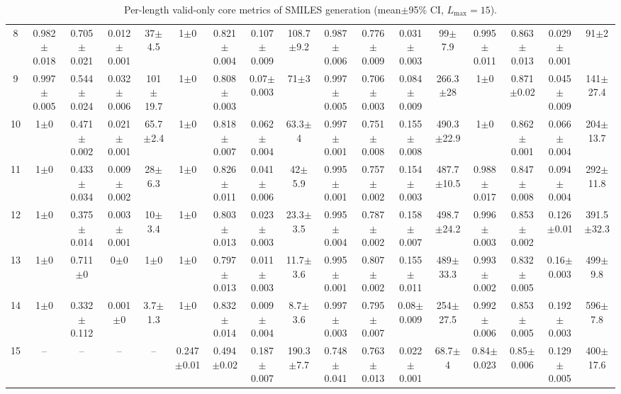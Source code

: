 \documentclass{article}
\theoremstyle{plain}
\theoremstyle{definition}
\theoremstyle{remark}
\begin{document}
\begin{table}[!htbp]
{\begin{tabular}{ccccccccccccccccc}
8 & 0.982$\pm$0.018 & 0.705$\pm$0.021 & 0.012$\pm$0.001 & 37$\pm$4.5 & 1$\pm$0 & 0.821$\pm$0.004 & 0.107$\pm$0.009 & 108.7$\pm$9.2 & 0.987$\pm$0.006 & 0.776$\pm$0.009 & 0.031$\pm$0.003 & 99$\pm$7.9 & 0.995$\pm$0.011 & 0.863$\pm$0.013 & 0.029$\pm$0.001 & 91$\pm$2 \\
9 & 0.997$\pm$0.005 & 0.544$\pm$0.024 & 0.032$\pm$0.006 & 101$\pm$19.7 & 1$\pm$0 & 0.808$\pm$0.003 & 0.07$\pm$0.003 & 71$\pm$3 & 0.997$\pm$0.005 & 0.706$\pm$0.003 & 0.084$\pm$0.009 & 266.3$\pm$28 & 1$\pm$0 & 0.871$\pm$0.02 & 0.045$\pm$0.009 & 141$\pm$27.4 \\
10 & 1$\pm$0 & 0.471$\pm$0.002 & 0.021$\pm$0.001 & 65.7$\pm$2.4 & 1$\pm$0 & 0.818$\pm$0.007 & 0.062$\pm$0.004 & 63.3$\pm$4 & 0.997$\pm$0.001 & 0.751$\pm$0.008 & 0.155$\pm$0.008 & 490.3$\pm$22.9 & 1$\pm$0 & 0.862$\pm$0.001 & 0.066$\pm$0.004 & 204$\pm$13.7 \\
11 & 1$\pm$0 & 0.433$\pm$0.034 & 0.009$\pm$0.002 & 28$\pm$6.3 & 1$\pm$0 & 0.826$\pm$0.011 & 0.041$\pm$0.006 & 42$\pm$5.9 & 0.995$\pm$0.001 & 0.757$\pm$0.002 & 0.154$\pm$0.003 & 487.7$\pm$10.5 & 0.988$\pm$0.017 & 0.847$\pm$0.008 & 0.094$\pm$0.004 & 292$\pm$11.8 \\
12 & 1$\pm$0 & 0.375$\pm$0.014 & 0.003$\pm$0.001 & 10$\pm$3.4 & 1$\pm$0 & 0.803$\pm$0.013 & 0.023$\pm$0.003 & 23.3$\pm$3.5 & 0.995$\pm$0.004 & 0.787$\pm$0.002 & 0.158$\pm$0.007 & 498.7$\pm$24.2 & 0.996$\pm$0.003 & 0.853$\pm$0.002 & 0.126$\pm$0.01 & 391.5$\pm$32.3 \\
13 & 1$\pm$0 & 0.711$\pm$0 & 0$\pm$0 & 1$\pm$0 & 1$\pm$0 & 0.797$\pm$0.013 & 0.011$\pm$0.003 & 11.7$\pm$3.6 & 0.995$\pm$0.001 & 0.807$\pm$0.002 & 0.155$\pm$0.011 & 489$\pm$33.3 & 0.993$\pm$0.002 & 0.832$\pm$0.005 & 0.16$\pm$0.003 & 499$\pm$9.8 \\
14 & 1$\pm$0 & 0.332$\pm$0.112 & 0.001$\pm$0 & 3.7$\pm$1.3 & 1$\pm$0 & 0.832$\pm$0.014 & 0.009$\pm$0.004 & 8.7$\pm$3.6 & 0.997$\pm$0.003 & 0.795$\pm$0.007 & 0.08$\pm$0.009 & 254$\pm$27.5 & 0.992$\pm$0.006 & 0.853$\pm$0.005 & 0.192$\pm$0.003 & 596$\pm$7.8 \\
15 & -- & -- & -- & -- & 0.247$\pm$0.01 & 0.494$\pm$0.02 & 0.187$\pm$0.007 & 190.3$\pm$7.7 & 0.748$\pm$0.041 & 0.763$\pm$0.013 & 0.022$\pm$0.001 & 68.7$\pm$4 & 0.84$\pm$0.023 & 0.85$\pm$0.006 & 0.129$\pm$0.005 & 400$\pm$17.6 \\
\bottomrule
\end{tabular}
}%
\caption{Per-length valid-only core metrics of SMILES generation (mean$\pm$95\% CI, $L_{\max}=15$).}
\label{tab:smiles_L15_bylen_valid_core}
\end{table}
\end{document}
